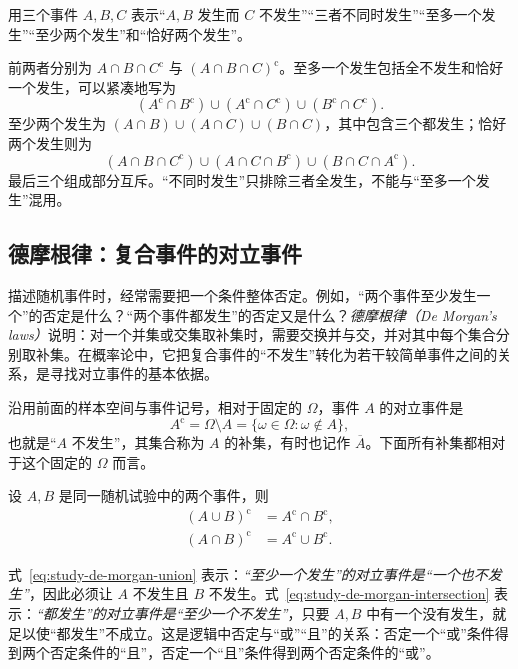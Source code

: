 \begin{example}
\label{ex:study-three-event-language}
用三个事件 $A,B,C$ 表示“$A,B$ 发生而 $C$ 不发生”“三者不同时发生”“至多一个发生”“至少两个发生”和“恰好两个发生”。
\end{example}

\begin{solve}
前两者分别为 $A\cap B\cap C^{\mathrm c}$ 与 $(A\cap B\cap C)^{\mathrm c}$。至多一个发生包括全不发生和恰好一个发生，可以紧凑地写为
\[
 (A^{\mathrm c}\cap B^{\mathrm c})\cup(A^{\mathrm c}\cap C^{\mathrm c})
 \cup(B^{\mathrm c}\cap C^{\mathrm c}).
\]
至少两个发生为 $(A\cap B)\cup(A\cap C)\cup(B\cap C)$，其中包含三个都发生；恰好两个发生则为
\[
 (A\cap B\cap C^{\mathrm c})\cup(A\cap C\cap B^{\mathrm c})
 \cup(B\cap C\cap A^{\mathrm c}).
\]
最后三个组成部分互斥。“不同时发生”只排除三者全发生，不能与“至多一个发生”混用。
\end{solve}

\subsection{德摩根律：复合事件的对立事件}
\label{subsec:study-de-morgan}

描述随机事件时，经常需要把一个条件整体否定。例如，“两个事件至少发生一个”的否定是什么？“两个事件都发生”的否定又是什么？\emph{德摩根律（De Morgan's laws）}说明：对一个并集或交集取补集时，需要交换并与交，并对其中每个集合分别取补集。在概率论中，它把复合事件的“不发生”转化为若干较简单事件之间的关系，是寻找对立事件的基本依据。

沿用前面的样本空间与事件记号，相对于固定的 $\Omega$，事件 $A$ 的对立事件是
\[
  A^{\mathrm c}=\Omega\setminus A
  =\{\omega\in\Omega:\omega\notin A\},
\]
也就是“$A$ 不发生”，其集合称为 $A$ 的补集，有时也记作 $\overline A$。下面所有补集都相对于这个固定的 $\Omega$ 而言。

\begin{proposition}[两个事件的德摩根律]
\label{prop:study-de-morgan}
设 $A,B$ 是同一随机试验中的两个事件，则
\begin{align}
  (A\cup B)^{\mathrm c}
    &=A^{\mathrm c}\cap B^{\mathrm c},
    \label{eq:study-de-morgan-union}\\
  (A\cap B)^{\mathrm c}
    &=A^{\mathrm c}\cup B^{\mathrm c}.
    \label{eq:study-de-morgan-intersection}
\end{align}
\end{proposition}

式~\eqref{eq:study-de-morgan-union} 表示：\emph{“至少一个发生”的对立事件是“一个也不发生”}，因此必须让 $A$ 不发生且 $B$ 不发生。式~\eqref{eq:study-de-morgan-intersection} 表示：\emph{“都发生”的对立事件是“至少一个不发生”}，只要 $A,B$ 中有一个没有发生，就足以使“都发生”不成立。这是逻辑中否定与“或”“且”的关系：否定一个“或”条件得到两个否定条件的“且”，否定一个“且”条件得到两个否定条件的“或”。

